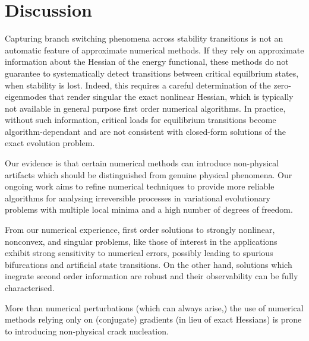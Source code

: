 
\section{Discussion} 
\label{sec:discussion}
    Capturing branch switching phenomena across stability transitions is not an automatic feature of approximate numerical methods. If they rely on approximate information about the Hessian of the energy functional, these methods do not guarantee to systematically detect transitions between critical equilbrium states, when stability is lost. 
Indeed, this requires a careful determination of the zero-eigenmodes that render singular the exact nonlinear Hessian, which is typically not available in general purpose first order numerical algorithms.
In practice, without such information, critical loads for equilibrium transitions become algorithm-dependant and are not consistent with closed-form solutions of the exact evolution problem.
% 


Our evidence is that certain numerical methods can introduce non-physical artifacts which should be distinguished from genuine physical phenomena. Our ongoing work aims to refine numerical techniques to provide more reliable algorithms for analysing irreversible processes in variational evolutionary problems with multiple local minima and a high number of degrees of freedom.

From our numerical experience, first order solutions to strongly nonlinear, nonconvex, and singular problems, like those of interest in the applications exhibit strong sensitivity to numerical errors, possibly leading to spurious bifurcations and artificial state transitions. On the other hand, solutions which inegrate second order information are robust and their observability can be fully characterised.

More than numerical perturbations (which can always arise,) the use of numerical methods relying only on (conjugate) gradients (in lieu of exact Hessians) is prone to introducing non-physical crack nucleation.


